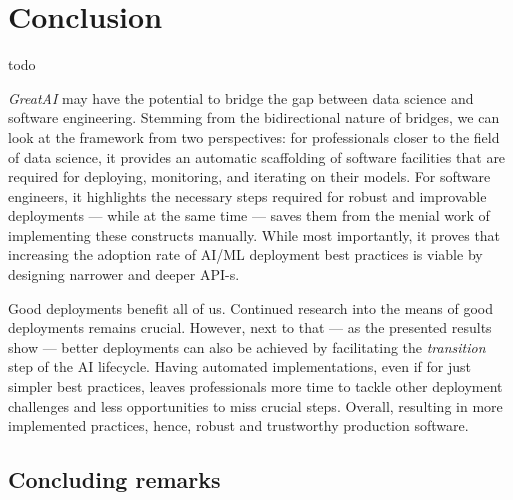 \chapter{Conclusion}  \label{chapter:conclusion}

todo

\textit{GreatAI} may have the potential to bridge the gap between data science and software engineering. Stemming from the bidirectional nature of bridges, we can look at the framework from two perspectives: for professionals closer to the field of data science, it provides an automatic scaffolding of software facilities that are required for deploying, monitoring, and iterating on their models. For software engineers, it highlights the necessary steps required for robust and improvable deployments --- while at the same time --- saves them from the menial work of implementing these constructs manually. While most importantly, it proves that increasing the adoption rate of AI/ML deployment best practices is viable by designing narrower and deeper API-s.

Good deployments benefit all of us. Continued research into the means of good deployments remains crucial. However, next to that --- as the presented results show --- better deployments can also be achieved by facilitating the \textit{transition} step of the AI lifecycle. Having automated implementations, even if for just simpler best practices, leaves professionals more time to tackle other deployment challenges and less opportunities to miss crucial steps. Overall, resulting in more implemented practices, hence, robust and trustworthy production software.

\section{Concluding remarks}
